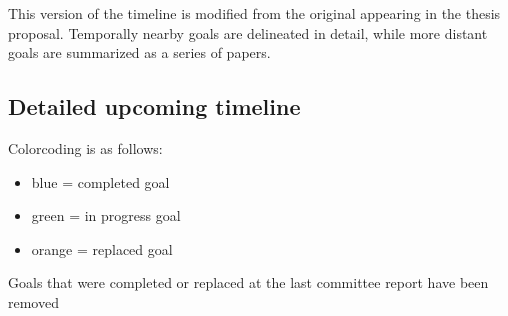 \documentclass[11pt]{article}
\begin{document}
This version of the timeline is modified from the original appearing in the thesis proposal. Temporally nearby goals are delineated in detail, while more distant goals are summarized as a series of papers. 

\subsection*{Detailed upcoming timeline}
Colorcoding is as follows:
    
    \begin{itemize}
    	\item {\color{RoyalBlue}blue} = completed goal
    	\item {\color{ForestGreen} green} = in progress goal
    	\item {\color{BurntOrange} orange} = replaced goal
    \end{itemize}

Goals that were completed or replaced at the last committee report have been removed
\end{document}
